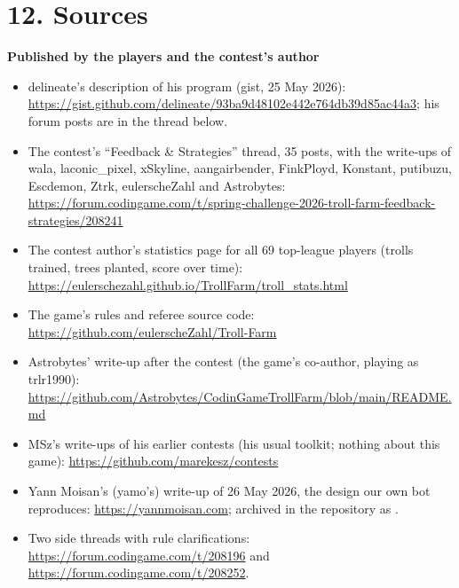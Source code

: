 \documentclass[10pt,a4paper]{article}
\begin{document}
\section*{12. Sources}

\textbf{Published by the players and the contest's author}
\begin{itemize}
\item delineate's description of his program (gist, 25 May 2026):\\ \url{https://gist.github.com/delineate/93ba9d48102e442e764db39d85ac44a3}; his forum posts are in the thread below.
\item The contest's ``Feedback \& Strategies'' thread, 35 posts, with the write-ups of wala, laconic\_pixel, xSkyline, aangairbender, FinkPloyd, Konstant, putibuzu, Escdemon, Ztrk, eulerscheZahl and Astrobytes: \url{https://forum.codingame.com/t/spring-challenge-2026-troll-farm-feedback-strategies/208241}
\item The contest author's statistics page for all 69 top-league players (trolls trained, trees planted, score over time): \url{https://eulerschezahl.github.io/TrollFarm/troll_stats.html}
\item The game's rules and referee source code: \url{https://github.com/eulerscheZahl/Troll-Farm}
\item Astrobytes' write-up after the contest (the game's co-author, playing as trlr1990):\\ \url{https://github.com/Astrobytes/CodinGameTrollFarm/blob/main/README.md}
\item MSz's write-ups of his earlier contests (his usual toolkit; nothing about this game): \url{https://github.com/marekesz/contests}
\item Yann Moisan's (yamo's) write-up of 26 May 2026, the design our own bot reproduces: \url{https://yannmoisan.com}; archived in the repository as .
\item Two side threads with rule clarifications: \url{https://forum.codingame.com/t/208196} and \url{https://forum.codingame.com/t/208252}.
\end{itemize}
\end{document}
